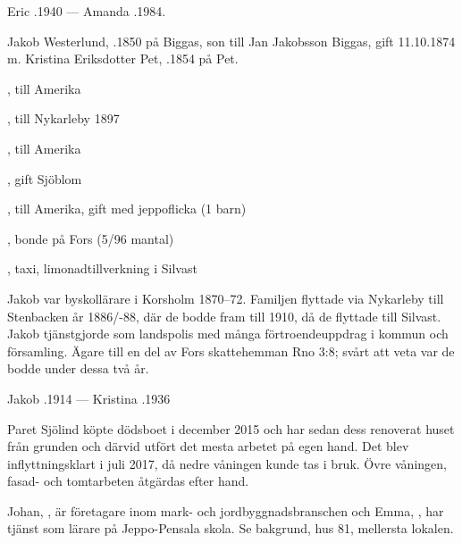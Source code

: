 Eric .1940  ---  Amanda .1984.


Jakob Westerlund, .1850 på Biggas, son till Jan Jakobsson Biggas, gift 11.10.1874 m. Kristina Eriksdotter Pet, .1854 på Pet.
\begin{jhchildren}
  \item {}, till Amerika
  \item {}, till Nykarleby 1897
  \item {}, till Amerika
  \item {}, gift Sjöblom
  \item {}, till Amerika, gift med jeppoflicka (1 barn)
  \item {}, bonde på Fors (5/96 mantal)
  \item {}
  \item {}
  \item {}
  \item {}, taxi, limonadtillverkning i Silvast
\end{jhchildren}
Jakob var byskollärare i Korsholm 1870--72. Familjen flyttade via Nykarleby till Stenbacken år 1886/-88, där de bodde fram till 1910, då de flyttade till Silvast. Jakob tjänstgjorde som landspolis med många förtroendeuppdrag i kommun och församling. Ägare till en del av Fors skattehemman Rno 3:8; svårt att veta var de bodde under dessa två år.

Jakob .1914  --- Kristina .1936






Paret Sjölind köpte dödsboet i december 2015 och har sedan dess renoverat huset från grunden och därvid utfört det mesta arbetet på egen hand. Det blev inflyttningsklart i juli 2017, då nedre våningen kunde tas i bruk. Övre våningen, fasad- och tomtarbeten åtgärdas efter hand.
\begin{jhchildren}
  \item {}
  \item {}
\end{jhchildren}
Johan, , är företagare inom mark- och jordbyggnadsbranschen och Emma, , har tjänst som lärare på Jeppo-Pensala skola. Se bakgrund, hus 81, mellersta lokalen.


